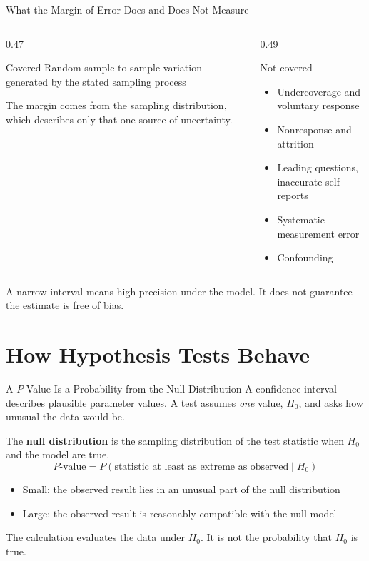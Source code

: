 \documentclass[aspectratio=169]{beamer}
\begin{document}
\begin{frame}{What the Margin of Error Does and Does Not Measure}
\begin{columns}[T,onlytextwidth]
\begin{column}{0.47\textwidth}
\begin{block}{Covered}
Random sample-to-sample variation generated by the stated sampling process
\end{block}
The margin comes from the sampling distribution, which describes only that one source of uncertainty.
\end{column}
\begin{column}{0.49\textwidth}
\begin{alertblock}{Not covered}
\begin{itemize}
  \item Undercoverage and voluntary response
  \item Nonresponse and attrition
  \item Leading questions, inaccurate self-reports
  \item Systematic measurement error
  \item Confounding
\end{itemize}
\end{alertblock}
\end{column}
\end{columns}
\vspace{0.2cm}
A narrow interval means high precision under the model. It does not guarantee the estimate is free of bias.
\end{frame}


\section{How Hypothesis Tests Behave}

\begin{frame}{A $P$-Value Is a Probability from the Null Distribution}
A confidence interval describes plausible parameter values. A test assumes \emph{one} value, $H_0$, and asks how unusual the data would be.

\vspace{0.15cm}
The \textbf{null distribution} is the sampling distribution of the test statistic when $H_0$ and the model are true.
$$P\text{-value}=P(\text{statistic at least as extreme as observed}\mid H_0)$$
\begin{itemize}
  \item Small: the observed result lies in an unusual part of the null distribution
  \item Large: the observed result is reasonably compatible with the null model
\end{itemize}
The calculation evaluates the data under $H_0$. It is not the probability that $H_0$ is true.
\end{frame}
\end{document}
